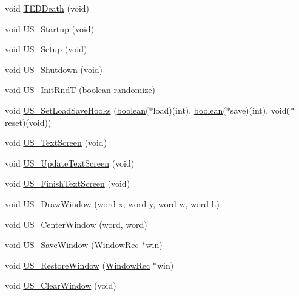 \begin{DoxyCompactItemize}
\item 
void \hyperlink{ID__US_8H_acc17ee7f6b4a6d3a5f3af994a06aae03}{TEDDeath} (void)
\item 
void \hyperlink{ID__US_8H_a25cccf3faa98e384b1f88c33a0a4e09f}{US\_\-Startup} (void)
\item 
void \hyperlink{ID__US_8H_a7f351b55990dbacb7f925f676fd19d23}{US\_\-Setup} (void)
\item 
void \hyperlink{ID__US_8H_aea2712f28a63f8aca70c66df1f532ecc}{US\_\-Shutdown} (void)
\item 
void \hyperlink{ID__US_8H_af90797d9eb1c8e16c131f5df8b98d97b}{US\_\-InitRndT} (\hyperlink{ID__HEAD_8H_a7c6368b321bd9acd0149b030bb8275ed}{boolean} randomize)
\item 
void \hyperlink{ID__US_8H_a136ce300263380c66dd7c5c51b87053f}{US\_\-SetLoadSaveHooks} (\hyperlink{ID__HEAD_8H_a7c6368b321bd9acd0149b030bb8275ed}{boolean}($\ast$load)(int), \hyperlink{ID__HEAD_8H_a7c6368b321bd9acd0149b030bb8275ed}{boolean}($\ast$save)(int), void($\ast$reset)(void))
\item 
void \hyperlink{ID__US_8H_a401247a70ea837fd7e1886aa1aa28ec1}{US\_\-TextScreen} (void)
\item 
void \hyperlink{ID__US_8H_a5b2db1bb79094d0a68de30116a9799c3}{US\_\-UpdateTextScreen} (void)
\item 
void \hyperlink{ID__US_8H_a63505d74840aed8700273284b1a784cd}{US\_\-FinishTextScreen} (void)
\item 
void \hyperlink{ID__US_8H_a06cee19903ed682701ef040c7f1b1ffa}{US\_\-DrawWindow} (\hyperlink{ID__HEAD_8H_abad51e07ab6d26bec9f1f786c8d65bcd}{word} x, \hyperlink{ID__HEAD_8H_abad51e07ab6d26bec9f1f786c8d65bcd}{word} y, \hyperlink{ID__HEAD_8H_abad51e07ab6d26bec9f1f786c8d65bcd}{word} w, \hyperlink{ID__HEAD_8H_abad51e07ab6d26bec9f1f786c8d65bcd}{word} h)
\item 
void \hyperlink{ID__US_8H_a0a6805dcfec12b770eb77c6b0f887bb4}{US\_\-CenterWindow} (\hyperlink{ID__HEAD_8H_abad51e07ab6d26bec9f1f786c8d65bcd}{word}, \hyperlink{ID__HEAD_8H_abad51e07ab6d26bec9f1f786c8d65bcd}{word})
\item 
void \hyperlink{ID__US_8H_ae18de9eca3bc3460904860a60bf6108e}{US\_\-SaveWindow} (\hyperlink{structWindowRec}{WindowRec} $\ast$win)
\item 
void \hyperlink{ID__US_8H_a0e39c60fcd5edda420d1caf8ebeb3c35}{US\_\-RestoreWindow} (\hyperlink{structWindowRec}{WindowRec} $\ast$win)
\item 
void \hyperlink{ID__US_8H_a9987548b83195953febc41d3a3bc86f2}{US\_\-ClearWindow} (void)

\end{DoxyCompactItemize}
